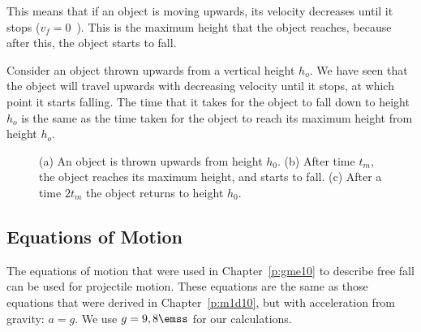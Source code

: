 This means that if an object is moving upwards, its velocity decreases until it stops ($v_f=0$~\ms). This is the maximum height that the object reaches, because after this, the object starts to fall.


Consider an object thrown upwards from a vertical height $h_o$. We have seen that the object will travel upwards with decreasing velocity until it stops, at which point it starts falling. The time that it takes for the object to fall down to height $h_o$ is the same as the time taken for the object to reach its maximum height from height $h_o$.

\begin{figure}[htbp]
\begin{center}
\caption{(a) An object is thrown upwards from height $h_0$. (b) After time $t_m$, the object reaches its maximum height, and starts to fall. (c) After a time $2t_m$ the object returns to height $h_0$.}
\label{fig:p:m:m2d12:maxheighttime}
\end{center}
\end{figure}


\subsection{Equations of Motion}
The equations of motion that were used in Chapter~\ref{p:gme10} to describe free fall can be used for projectile motion. These equations are the same as those equations that were derived in Chapter~\ref{p:m1d10}, but with acceleration from gravity: $a=g$. We use $g=9,8\emss$ for our calculations. 

